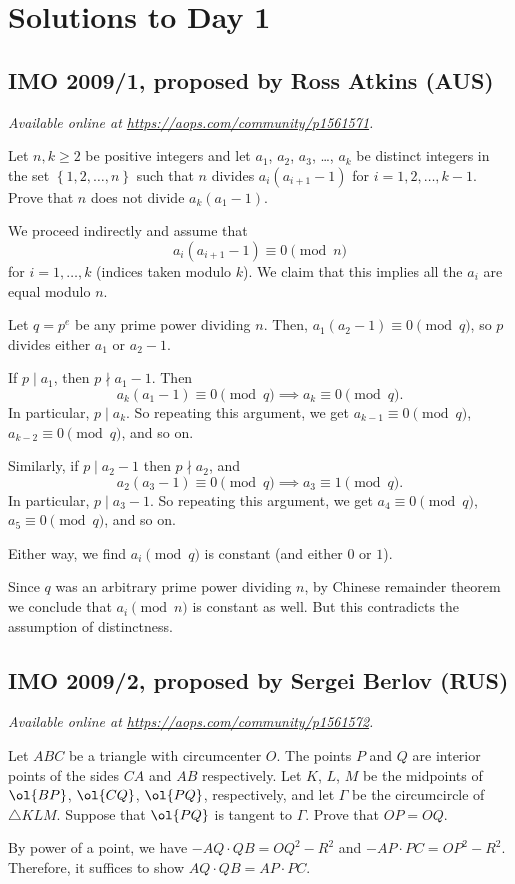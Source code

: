 \documentclass[11pt]{scrartcl}
\begin{document}
\section{Solutions to Day 1}
\subsection{IMO 2009/1, proposed by Ross Atkins (AUS)}
\textsl{Available online at \url{https://aops.com/community/p1561571}.}
\begin{mdframed}[style=mdpurplebox,frametitle={Problem statement}]
Let $n, k \ge 2$ be positive integers and let $a_1$, $a_2$, $a_3$, \dots, $a_k$
be distinct integers in the set $\left\{ 1,2,\dots,n \right\}$
such that $n$ divides $a_i(a_{i+1} - 1)$ for $i = 1,2,\dots,k-1$.
Prove that $n$ does not divide $a_k(a_1 - 1)$.
\end{mdframed}
We proceed indirectly and assume that
\[ a_i (a_{i+1}-1) \equiv 0 \pmod n \]
for $i = 1, \dots, k$ (indices taken modulo $k$).
We claim that this implies all the $a_i$ are equal modulo $n$.

Let $q = p^e$ be any prime power dividing $n$.
Then, $a_1 (a_2 - 1) \equiv 0 \pmod q$, so $p$ divides either $a_1$ or $a_2-1$.
\begin{itemize}
  \ii If $p \mid a_1$, then $p \nmid a_1 - 1$. Then
  \[ a_k (a_1-1) \equiv 0 \pmod q \implies a_k \equiv 0 \pmod q. \]
  In particular, $p \mid a_k$.
  So repeating this argument,
  we get $a_{k-1} \equiv 0 \pmod q$, $a_{k-2} \equiv 0 \pmod q$, and so on.

  \ii Similarly, if $p \mid a_2 - 1$ then $p \nmid a_2$, and
  \[ a_2 (a_3-1) \equiv 0 \pmod q \implies a_3 \equiv 1 \pmod q.  \]
  In particular, $p \mid a_3 - 1$.
  So repeating this argument,
  we get $a_4 \equiv 0 \pmod q$, $a_5 \equiv 0 \pmod q$, and so on.
\end{itemize}
Either way, we find $a_i \pmod q$ is constant (and either $0$ or $1$).

Since $q$ was an arbitrary prime power dividing $n$,
by Chinese remainder theorem we conclude that $a_i \pmod n$ is constant as well.
But this contradicts the assumption of distinctness.
\pagebreak

\subsection{IMO 2009/2, proposed by Sergei Berlov (RUS)}
\textsl{Available online at \url{https://aops.com/community/p1561572}.}
\begin{mdframed}[style=mdpurplebox,frametitle={Problem statement}]
Let $ABC$ be a triangle with circumcenter $O$.
The points $P$ and $Q$ are interior points of the sides $CA$ and $AB$ respectively.
Let $K$, $L$, $M$ be the midpoints of $\ol{BP}$, $\ol{CQ}$, $\ol{PQ}$,
respectively, and let $\Gamma$ be the circumcircle of $\triangle KLM$.
Suppose that $\ol{PQ}$ is tangent to $\Gamma$. Prove that $OP = OQ$.
\end{mdframed}
By power of a point, we have $-AQ \cdot QB = OQ^2 - R^2$
and $-AP \cdot PC = OP^2 - R^2$.
Therefore, it suffices to show $AQ \cdot QB = AP \cdot PC$.
\end{document}
